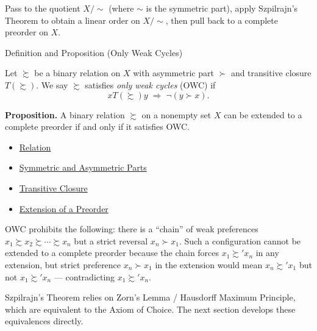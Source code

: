 \begin{remark*}[Proof]
Pass to the quotient $X/{\sim}$ (where $\sim$ is the symmetric part), apply
Szpilrajn's Theorem to obtain a linear order on $X/{\sim}$, then pull back
to a complete preorder on $X$.
\end{remark*}

\begin{definitionbox}{Definition and Proposition (Only Weak Cycles)}
\begin{definition}\label{def:owc}
Let $\succsim$ be a binary relation on $X$ with asymmetric part $\succ$ and
transitive closure $T(\succsim)$. We say $\succsim$ satisfies \emph{only weak
cycles} (OWC) if
\[
  xT(\succsim)y \;\Rightarrow\; \lnot(y \succ x).
\]

\medskip
\noindent\textbf{Proposition.} A binary relation $\succsim$ on a nonempty
set $X$ can be extended to a complete preorder if and only if it satisfies
OWC.
\end{definition}
\end{definitionbox}

\begin{dependencies}
\begin{itemize}
  \item \hyperref[def:relation]{Relation}
  \item \hyperref[def:sym-asym]{Symmetric and Asymmetric Parts}
  \item \hyperref[def:trans-closure]{Transitive Closure}
  \item \hyperref[def:preorder-extension]{Extension of a Preorder}
\end{itemize}
\end{dependencies}

\begin{remark*}
OWC prohibits the following: there is a ``chain'' of weak preferences
$x_1 \succsim x_2 \succsim \cdots \succsim x_n$ but a strict reversal
$x_n \succ x_1$. Such a configuration cannot be extended to a complete
preorder because the chain forces $x_1 \succsim' x_n$ in any extension, but
strict preference $x_n \succ x_1$ in the extension would mean
$x_n \succsim' x_1$ but not $x_1 \succsim' x_n$ --- contradicting
$x_1 \succsim' x_n$.
\end{remark*}

\begin{remark*}[Transition to AC]
Szpilrajn's Theorem relies on Zorn's Lemma / Hausdorff Maximum Principle,
which are equivalent to the Axiom of Choice. The next section develops
these equivalences directly.
\end{remark*}
